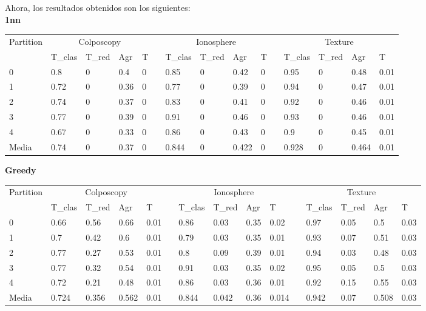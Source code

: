 \documentclass[11pt]{article}
\begin{document}
Ahora, los resultados obtenidos son los siguientes: \\

\textbf{1nn}\\

\begin{tabular}{lllllllllllllll}
Partition & \multicolumn{4}{c}{Colposcopy} &  & \multicolumn{4}{c}{Ionosphere} &  & \multicolumn{4}{c}{Texture}     \\
          & T\_clas  & T\_red  & Agr   & T &  & T\_clas  & T\_red  & Agr   & T &  & T\_clas & T\_red & Agr   & T    \\
0         & 0.8      & 0       & 0.4   & 0 &  & 0.85     & 0       & 0.42  & 0 &  & 0.95    & 0      & 0.48  & 0.01 \\
1         & 0.72     & 0       & 0.36  & 0 &  & 0.77     & 0       & 0.39  & 0 &  & 0.94    & 0      & 0.47  & 0.01 \\
2         & 0.74     & 0       & 0.37  & 0 &  & 0.83     & 0       & 0.41  & 0 &  & 0.92    & 0      & 0.46  & 0.01 \\
3         & 0.77     & 0       & 0.39  & 0 &  & 0.91     & 0       & 0.46  & 0 &  & 0.93    & 0      & 0.46  & 0.01 \\
4         & 0.67     & 0       & 0.33  & 0 &  & 0.86     & 0       & 0.43  & 0 &  & 0.9     & 0      & 0.45  & 0.01 \\
Media     & 0.74     & 0       & 0.37  & 0 &  & 0.844    & 0       & 0.422 & 0 &  & 0.928   & 0      & 0.464 & 0.01
\end{tabular}

\textbf{Greedy}\\
	
\hspace{-1cm}\begin{tabular}{lllllllllllllll}
Partition & \multicolumn{4}{c}{Colposcopy}  &  & \multicolumn{4}{c}{Ionosphere}  &  & \multicolumn{4}{c}{Texture}     \\
          & T\_clas & T\_red & Agr   & T    &  & T\_clas & T\_red & Agr  & T     &  & T\_clas & T\_red & Agr   & T    \\
0         & 0.66    & 0.56   & 0.66  & 0.01 &  & 0.86    & 0.03   & 0.35 & 0.02  &  & 0.97    & 0.05   & 0.5   & 0.03 \\
1         & 0.7     & 0.42   & 0.6   & 0.01 &  & 0.79    & 0.03   & 0.35 & 0.01  &  & 0.93    & 0.07   & 0.51  & 0.03 \\
2         & 0.77    & 0.27   & 0.53  & 0.01 &  & 0.8     & 0.09   & 0.39 & 0.01  &  & 0.94    & 0.03   & 0.48  & 0.03 \\
3         & 0.77    & 0.32   & 0.54  & 0.01 &  & 0.91    & 0.03   & 0.35 & 0.02  &  & 0.95    & 0.05   & 0.5   & 0.03 \\
4         & 0.72    & 0.21   & 0.48  & 0.01 &  & 0.86    & 0.03   & 0.36 & 0.01  &  & 0.92    & 0.15   & 0.55  & 0.03 \\
Media     & 0.724   & 0.356  & 0.562 & 0.01 &  & 0.844   & 0.042  & 0.36 & 0.014 &  & 0.942   & 0.07   & 0.508 & 0.03
\end{tabular}\\
\end{document}
